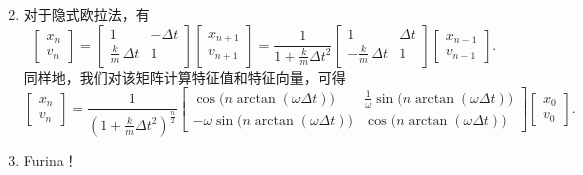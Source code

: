 \begin{enumerate}
\[		\]
	\item 对于隐式欧拉法，有
		\[
			\begin{bmatrix}x_{n}\\v_{n}\end{bmatrix}
			=
			\begin{bmatrix}
				1 & -\Delta t\\
				\tfrac{k}{m}\,\Delta t & 1
			\end{bmatrix}
			\begin{bmatrix}x_{n+1}\\v_{n+1}\end{bmatrix}
			=
			\frac1{1+\tfrac{k}{m}\Delta t^2}
			\begin{bmatrix}
				1 & \Delta t\\
				-\tfrac{k}{m}\,\Delta t & 1
			\end{bmatrix}
			\begin{bmatrix}x_{n-1}\\v_{n-1}\end{bmatrix}.
		\]
		同样地，我们对该矩阵计算特征值和特征向量，可得
		\[
			\begin{bmatrix}x_{n}\\v_{n}\end{bmatrix}
			=
			\frac1{(1+\tfrac{k}{m}\Delta t^2)^{\frac n2}}
			\begin{bmatrix}
				\cos\bigl(n\arctan(\omega\Delta t)\bigr) &
				\tfrac1\omega\sin\bigl(n\arctan(\omega\Delta t)\bigr)\\
				-\omega\sin\bigl(n\arctan(\omega\Delta t)\bigr) &
				\cos\bigl(n\arctan(\omega\Delta t)\bigr)
			\end{bmatrix}
			\begin{bmatrix}x_0\\v_0\end{bmatrix}.
		\]
	\item Furina！
\end{enumerate}
